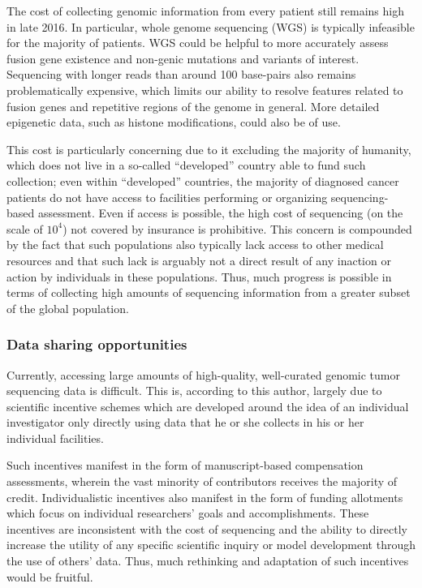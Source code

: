 The cost of collecting genomic information from every patient still remains high in late 2016. In particular, whole genome sequencing (WGS) is typically infeasible for the majority of patients. WGS could be helpful to more accurately assess fusion gene existence and non-genic mutations and variants of interest. Sequencing with longer reads than around 100 base-pairs also remains problematically expensive, which limits our ability to resolve features related to fusion genes and repetitive regions of the genome in general. More detailed epigenetic data, such as histone modifications, could also be of use. 

This cost is particularly concerning due to it excluding the majority of humanity, which does not live in a so-called ``developed'' country able to fund such collection\cite{_97_2015}; even within ``developed'' countries, the majority of diagnosed cancer patients do not have access to facilities performing or organizing sequencing-based assessment. Even if access is possible, the high cost of sequencing (on the scale of $10^4$) not covered by insurance is prohibitive\cite{regalado_why_2016}. This concern is compounded by the fact that such populations also typically lack access to other medical resources and that such lack is arguably not a direct result of any inaction or action by individuals in these populations. Thus, much progress is possible in terms of collecting high amounts of sequencing information from a greater subset of the global population. 

\subsubsection{Data sharing opportunities}

Currently, accessing large amounts of high-quality, well-curated genomic tumor sequencing data is difficult. This is, according to this author, largely due to scientific incentive schemes which are developed around the idea of an individual investigator only directly using data that he or she collects in his or her individual facilities.

Such incentives manifest in the form of manuscript-based compensation assessments, wherein the vast minority of contributors receives the majority of credit. Individualistic incentives also manifest in the form of funding allotments which focus on individual researchers' goals and accomplishments. These incentives are inconsistent with the cost of sequencing and the ability to directly increase the utility of any specific scientific inquiry or model development through the use of others' data. Thus, much rethinking and adaptation of such incentives would be fruitful. 

